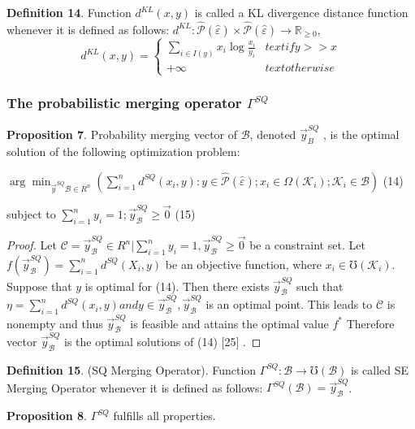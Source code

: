 \documentclass[]{iosart2c}
\begin{document}
  \textbf{Definition 14}. Function $d^{KL}(x, y)$ is called a KL divergence distance function whenever it is defined as follows: $d^{KL} : \hat{\mathcal{P}} (\hat{\varepsilon}) \times \hat{\mathcal{P}} (\hat{\varepsilon}) \to \mathbb{R}_{\geq0}$, $$d^{KL}(x, y) =
  \begin{cases}
    \sum_{i \in I(y)} {x_i \log{\frac{x_i}{y_i}}} &text{if} y >> x \\
    +\infty    &text{otherwise}
  \end{cases}
  $$

  \subsubsection{The probabilistic merging operator $\Gamma^{SQ}$}

  \textbf{Proposition 7}. Probability merging vector of $\mathcal{B}$, denoted $\vec{y}^{SQ}_B$ , is the optimal solution of the following optimization problem:

  $\arg \min_{\vec{y}^{SQ}\mathcal{B} \in R^n}\left( \sum^n_{i=1} d^{SQ}(x_i, y) : y \in \hat{\mathcal{P}} (\hat{\varepsilon});x_i \in \Omega(\mathcal{K}_i);\mathcal{K}_i \in \mathcal{B} \right)$ (14)

  subject to $\sum^n_{i=1}y_i = 1;\vec{y}^{SQ}_\mathcal{B} \geq \vec{0}$ (15)

  \begin{proof}
    Let $\mathcal{C} = {\vec{y}^{SQ}_\mathcal{B} \in R^n | \sum^n_{i=1}  y_i = 1, \vec{y}^{SQ}_\mathcal{B} \geq \vec{0}}$ be a constraint set. Let $f(\vec{y}^{SQ}_\mathcal{B} ) = \sum^n_{i=1} d^{SQ}(X_i, y)$ be an objective function, where $x_i \in \mho(\mathcal{K}_i)$. Suppose that $y$ is optimal for (14). Then there exists $\vec{y}^{SQ}_\mathcal{B}$ such that $\eta = \sum^n_{i=1} d^{SQ}(x_i, y) and y \in \vec{y}^{SQ}_\mathcal{B} , \vec{y}^{SQ}_\mathcal{B}$ is an optimal point. This leads to $\mathcal{C}$ is nonempty and thus $\vec{y}^{SQ}_\mathcal{B}$ is feasible and attains the optimal value $f^*$ Therefore vector $\vec{y}^{SQ}_\mathcal{B}$ is the optimal solutions of (14) [25] .
  \end{proof}

  \textbf{Definition 15}. (SQ Merging Operator). Function $\Gamma^{SQ} : \mathcal{B} \to \mho (\mathcal{B})$ is called SE Merging Operator whenever it is defined as follows:
  $\Gamma^{SQ}(\mathcal{B}) = \vec{y}^{SQ}_\mathcal{B}$.

  \textbf{Proposition 8}. $\Gamma^{SQ}$ fulfills all properties.
\end{document}
